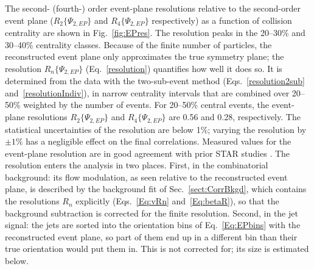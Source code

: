 The second- (fourth-) order event-plane resolutions relative to the second-order event plane ($R_2\{\Psi_{2, EP}\}$ and $R_4\{\Psi_{2, EP}\}$ respectively) as a function of collision centrality are shown in Fig.~\ref{fig:EPres}.  The resolution peaks in the 20--30\% and 30--40\% centrality classes.  %
Because of the finite number of particles, the reconstructed event plane only approximates the true symmetry plane; the resolution $R_n\{\Psi_{2,EP}\}$ (Eq.~\ref{resolution}) quantifies how well it does so.
%
It is determined from the data with the two-sub-event method (Eqs.~\ref{resolution2sub} and~\ref{resolutionIndiv}), in narrow centrality intervals that are combined over 20--50\% weighted by the number of events.
%
For 20--50\% central events, the event-plane resolutions $R_2\{\Psi_{2, EP}\}$ and $R_4\{\Psi_{2, EP}\}$ are 0.56 and 0.28, respectively.  The statistical uncertainties of the resolution are below 1\%; varying the resolution by $\pm 1\%$ has a negligible effect on the final \dphi correlations.  Measured values for the event-plane resolution are in good agreement with prior STAR studies \cite{Agakishiev:2014ada}.  The resolution enters the analysis in two places.
%
First, in the combinatorial background: its flow modulation, as seen relative to the reconstructed event plane, is described by the background fit of Sec.~\ref{sect:CorrBkgd}, which contains the resolutions \(R_n\) explicitly (Eqs.~\ref{Eq:vRn} and~\ref{Eq:betaR}), so that the background subtraction is corrected for the finite resolution.
%
Second, in the jet signal: the jets are sorted into the orientation bins of Eq.~\ref{Eq:EPbins} with the reconstructed event plane, so part of them end up in a different bin than their true orientation would put them in.
%
This is not corrected for; its size is estimated below.
